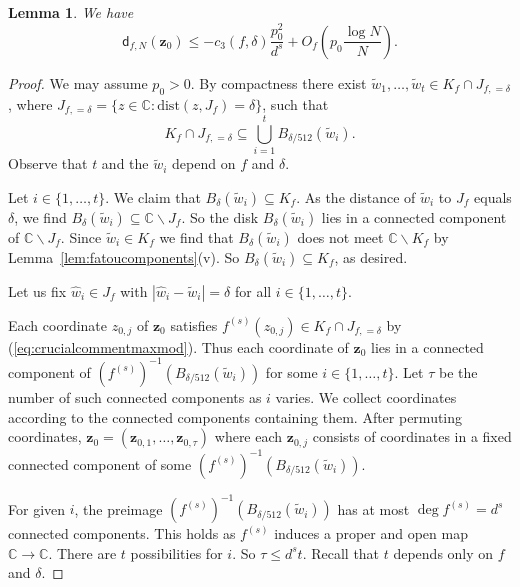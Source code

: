 \documentclass[12pt,oneside,a4]{amsart}
\newcommand{\IC}{\mathbb{C}}
\newcounter{maincounter}
\numberwithin{maincounter}{section}
\numberwithin{equation}{section}
\newtheorem{lemma}[maincounter]{Lemma}
\renewcommand{\subset}{\subseteq}
\newcommand{\ssm}{\smallsetminus}
\newcommand{\bfz}{\boldsymbol{z}}
\begin{document}
\begin{lemma}
  \label{lem:DfNieq0}
  We have
  \begin{equation*}
    \mathsf{d}_{f,N}(\bfz_0)
    \le -c_3(f,\delta)\frac{p_0^2}{d^s}+ O_{f}\left(p_0\frac{\log N}{N}\right).
  \end{equation*}
\end{lemma}
\begin{proof}
  We may assume $p_0>0$.
  By compactness there exist $\widetilde w_1,\ldots,\widetilde w_t\in
  K_f \cap J_{f,=\delta}$, where  $J_{f,=\delta} = \{z\in\IC :\mathrm{dist}(z,J_f)=\delta\}$, such that
  \begin{equation*}
    K_f \cap J_{f,=\delta} \subset \bigcup_{i=1}^t B_{\delta/512}(\widetilde
    w_i). 
  \end{equation*}
  Observe that $t$ and the $\widetilde w_i$ depend on $f$ and
  $\delta$. 


  Let $i\in \{1,\ldots,t\}$. We claim that ${B_{\delta}(\widetilde w_i)}\subset  K_f$. 
  As the distance of $\widetilde w_i$ to $J_f$ equals $\delta$, we find
  ${B_{\delta}(\widetilde w_i)} \subset \IC\ssm J_f$.
  So the  disk ${B_{\delta}(\widetilde w_i)}$  lies in a connected
  component of $\IC\ssm J_f$.
  Since $\widetilde w_i\in K_f$ we find that ${B_{\delta}(\widetilde
    w_i)}$ does not meet  $\IC\ssm K_f$
  by Lemma~\ref{lem:fatoucomponents}(v). 
  So
  ${B_{\delta}(\widetilde
    w_i)}\subset K_f$, as desired.


  Let us  fix $\widehat w_i \in J_f$ with
  $|\widehat w_i-\widetilde w_i|=\delta$
  for all $i\in \{1,\ldots,t\}$.

  Each coordinate $z_{0,j}$ of $\bfz_0$ satisfies $f^{(s)}(z_{0,j}) \in
  K_f\cap J_{f,=\delta}$ by (\ref{eq:crucialcommentmaxmod}).
  Thus each  coordinate of $\bfz_0$ lies
  in a connected component
  of  $(f^{(s)})^{-1}(B_{\delta/512}(\widetilde w_i))$ for some
  $i\in\{1,\ldots,t\}$.
  Let $\tau$ be the number of such connected components as $i$ varies.  
  We collect 
  coordinates according to  the  connected components containing them.
  After permuting coordinates,
  $\bfz_0=(\bfz_{0,1},\ldots,\bfz_{0,\tau})$
  where each $\bfz_{0,j}$ consists of coordinates in a fixed connected
  component of some $(f^{(s)})^{-1}(B_{\delta/512}(\widetilde
  w_i))$.

  For given $i$, the preimage $(f^{(s)})^{-1}(B_{\delta/512}(\widetilde w_i))$
  has at most $\deg f^{(s)}=d^s$ connected components. This holds as
  $f^{(s)}$ induces a proper and open map $\IC\rightarrow\IC$. 
  There are $t$ possibilities for
  $i$. So $\tau \le d^s t$. Recall that $t$ depends only on $f$ and
  $\delta$.
  

\end{proof}
\end{document}
